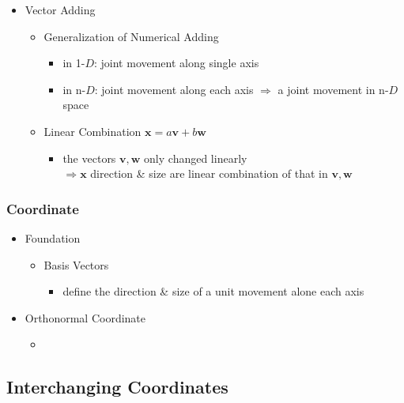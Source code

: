 \begin{itemize}
\item Vector Adding
	\begin{itemize}
	\item Generalization of Numerical Adding
		\begin{itemize}
		\item in 1-$D$: joint movement along single axis
		\item in n-$D$: joint movement along each axis $\Rightarrow$ a joint movement in n-$D$ space
		\end{itemize}
	\item Linear Combination $\mathbf x = a\mathbf v + b\mathbf w$
		\begin{itemize}
		\item the vectors $\mathbf v, \mathbf w$ only changed linearly \\
			$\Rightarrow \mathbf x$ direction \& size are linear combination of that in $\mathbf v, \mathbf w$
		\end{itemize}
	\end{itemize}

\end{itemize}

\subsubsection{Coordinate}
\begin{itemize}
\item Foundation
	\begin{itemize}
	\item Basis Vectors
		\begin{itemize}
		\item define the direction \& size of a unit movement alone each axis
		\end{itemize}
	\end{itemize}
\item Orthonormal Coordinate
	\begin{itemize}
	\item 
	\end{itemize}
\end{itemize}

\subsection{Interchanging Coordinates}

